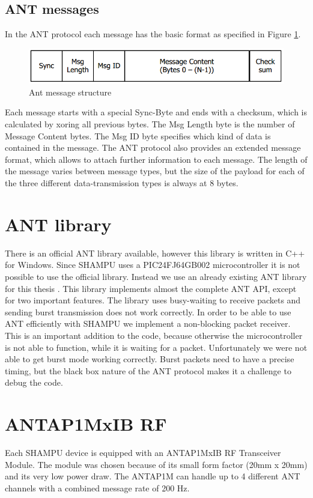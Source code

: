 \subsection{ANT messages}
In the ANT protocol each message has the basic format as specified in Figure \ref{fig:antmsg}.
\begin{figure}[H]
	\centering
	\includegraphics[scale=.75]{content/images/ANTmsg.png}
	\caption{Ant message structure\cite{DynastreamInnovationsInc.2013}}\label{fig:antmsg}
\end{figure}
Each message starts with a special Sync-Byte and ends with a checksum, which is calculated by xoring all previous bytes. The Msg Length byte is the number of Message Content bytes. The Msg ID byte specifies which kind of data is contained in the message. The ANT protocol also provides an extended message format, which allows to attach further information to each message. The length of the message varies between message types, but the size of the payload for each of the three different data-transmission types is always at 8 bytes.

\section{ANT library}
There is an official ANT library \cite{ANTWinLib} available, however this library is written in C++ for Windows. Since SHAMPU uses a PIC24FJ64GB002 microcontroller\cite{smeets2014demonstration} it is not possible to use the official library. Instead we use an already existing ANT library for this thesis \cite{ANTPICLIB}. This library implements almost the complete ANT API, except for two important features. The library uses busy-waiting to receive packets and sending burst transmission does not work correctly. In order to be able to use ANT efficiently with SHAMPU we implement a non-blocking packet receiver. This is an important addition to the code, because otherwise the microcontroller is not able to function, while it is waiting for a packet. Unfortunately we were not able to get burst mode working correctly. Burst packets need to have a precise timing, but the black box nature of the ANT protocol makes it a challenge to debug the code.
\newpage
\section{ANTAP1MxIB RF}
Each SHAMPU device is equipped with an ANTAP1MxIB RF Transceiver Module. The module was chosen because of its small form factor (20mm x 20mm) and its very low power draw. The ANTAP1M can handle up to 4 different ANT channels with a combined message rate of 200 Hz. 


